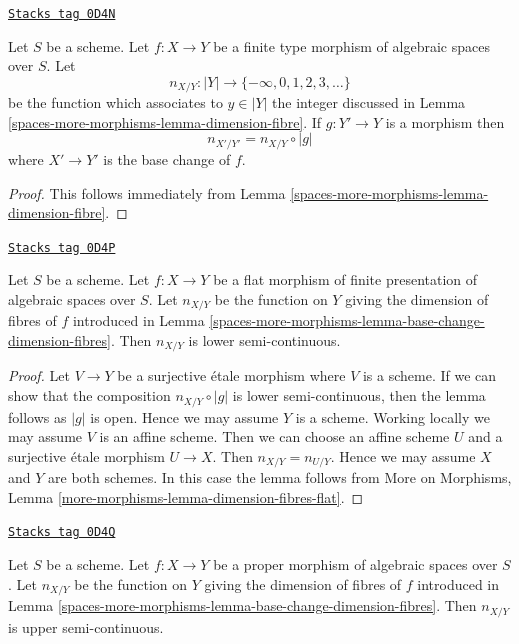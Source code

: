 \begin{lemma}
\label{spaces-more-morphisms-lemma-base-change-dimension-fibres}
\href{https://stacks.math.columbia.edu/tag/0D4N}{\texttt{Stacks tag 0D4N}}

Let $S$ be a scheme. Let $f : X \to Y$ be a finite type morphism of
algebraic spaces over $S$. Let
$$
n_{X/Y} : |Y| \to \{-\infty, 0, 1, 2, 3, \ldots\}
$$
be the function which associates to $y \in |Y|$ the
integer discussed in Lemma \ref{spaces-more-morphisms-lemma-dimension-fibre}.
If $g : Y' \to Y$ is a morphism then
$$
n_{X'/Y'} = n_{X/Y} \circ |g|
$$
where $X' \to Y'$ is the base change of $f$.
\end{lemma}

\begin{proof}
This follows immediately from
Lemma \ref{spaces-more-morphisms-lemma-dimension-fibre}.
\end{proof}

\begin{lemma}
\label{spaces-more-morphisms-lemma-dimension-fibres-flat}
\href{https://stacks.math.columbia.edu/tag/0D4P}{\texttt{Stacks tag 0D4P}}

Let $S$ be a scheme.
Let $f : X \to Y$ be a flat morphism of finite presentation of
algebraic spaces over $S$. Let
$n_{X/Y}$ be the function on $Y$ giving the dimension of fibres of $f$
introduced in Lemma \ref{spaces-more-morphisms-lemma-base-change-dimension-fibres}.
Then $n_{X/Y}$ is lower semi-continuous.
\end{lemma}

\begin{proof}
Let $V \to Y$ be a surjective \'etale morphism where $V$ is a scheme.
If we can show that the composition $n_{X/Y} \circ |g|$
is lower semi-continuous, then the lemma follows as $|g|$ is open.
Hence we may assume $Y$ is a scheme.
Working locally we may assume $V$ is an affine scheme.
Then we can choose an affine scheme $U$ and a surjective
\'etale morphism $U \to X$. Then $n_{X/Y} = n_{U/Y}$.
Hence we may assume $X$ and $Y$ are both schemes.
In this case the lemma follows from
More on Morphisms, Lemma \ref{more-morphisms-lemma-dimension-fibres-flat}.
\end{proof}

\begin{lemma}
\label{spaces-more-morphisms-lemma-dimension-fibres-proper}
\href{https://stacks.math.columbia.edu/tag/0D4Q}{\texttt{Stacks tag 0D4Q}}

Let $S$ be a scheme.
Let $f : X \to Y$ be a proper morphism of algebraic spaces over $S$. Let
$n_{X/Y}$ be the function on $Y$ giving the dimension of fibres of $f$
introduced in Lemma \ref{spaces-more-morphisms-lemma-base-change-dimension-fibres}.
Then $n_{X/Y}$ is upper semi-continuous.
\end{lemma}


